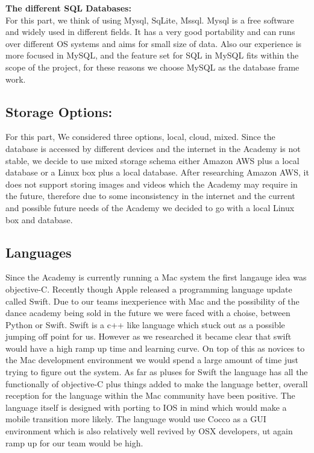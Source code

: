 \documentclass[11pt]{book}
\begin{document}
\textbf{The different SQL Databases:}\\
For this part, we think of using Mysql, SqLite, Mssql. Mysql is a free software and widely used in different fields. It has a very good portability and can runs over different OS systems and aims for small size of data. Also our experience is more focused in MySQL, and the feature set for SQL in MySQL fits within the scope of the project, for these reasons we choose MySQL as the database frame work.

\subsection{Storage Options:}
For this part, We considered three options, local, cloud, mixed. Since the database is accessed by different devices and the internet in the Academy is not stable, we decide to use mixed storage schema either Amazon AWS plus a local database or a Linux box plus a local database. After researching Amazon AWS, it does not support storing images and videos which the Academy may require in the future, therefore   due to some inconsistency in the internet and the current and possible future needs of the Academy we decided to go with a local Linux box and database.\\

\subsection{Languages}
Since the Academy is currently running a Mac system the first langauge idea was objective-C. Recently though Apple released a programming language update called Swift. Due to our teams inexperience with Mac and the possibility of the dance academy being sold in the future we were faced with a choise, between Python or Swift. Swift is a c++ like language which stuck out as a possible jumping off point for us. However as we researched it became clear that swift would have a high ramp up time and learning curve. On top of this as novices to the Mac development environment we would spend a large amount of time just trying to figure out the system. As far as pluses for Swift the language has all the functionally of objective-C plus things added to make the language better, overall reception for the language within the Mac community have been positive. The language itself is designed with porting to IOS in mind which would make a mobile transition more likely. The language would use Cocco as a GUI environment which is also relatively well revived by OSX developers, ut again ramp up for our team would be high.
\end{document}
